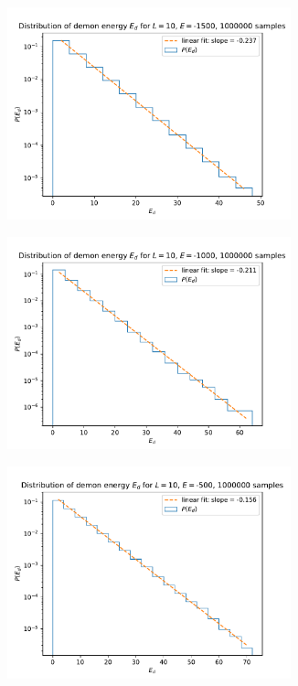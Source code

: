 \documentclass[11pt,a4paper]{article}
\begin{document}
\begin{figure}[b]
\begin{subfigure}{.5\textwidth}
	\end{subfigure}%
	\begin{subfigure}{.5\textwidth}
		\centering
		\includegraphics[width=0.9\textwidth]{E_d_L10_E1500.pdf}
	\end{subfigure}
	\begin{subfigure}{.5\textwidth}
		\centering
		\includegraphics[width=0.9\textwidth]{E_d_L10_E1000.pdf}
	\end{subfigure}%
	\begin{subfigure}{.5\textwidth}
		\centering
		\includegraphics[width=0.9\textwidth]{E_d_L10_E500.pdf}

\end{subfigure}
\end{figure}
\end{document}
